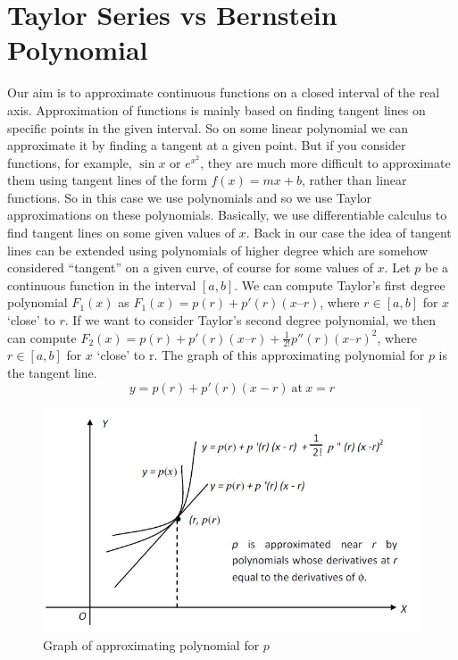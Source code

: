 \documentclass{article}
\begin{document}
\section{Taylor Series vs Bernstein Polynomial}\label{sec:tsvsbp}
Our aim is to approximate continuous functions on a closed interval of the real axis. Approximation of functions is mainly based on finding tangent lines on specific points in the given interval. So on some linear polynomial we can approximate it by finding a tangent at a given point. But if you consider functions, for example, $\sin x$ or  $e^{x^2} $, they are much more difficult to approximate them using tangent lines of the form $f(x) =mx+b$, rather than linear functions. So in this case we use polynomials and so we use Taylor approximations on these polynomials. Basically, we use differentiable calculus to find tangent lines on some given values of $x$. Back in our case the idea of tangent lines can be extended using polynomials of higher degree which are somehow considered ``tangent'' on a given curve, of course for some values of $x$.
Let $p$ be a continuous function in the interval $[a,b]$. We can compute Taylor’s first degree polynomial $F_1(x)$ as $F_1(x)=p(r) + p'(r) (x – r)$, where $r\in[a,b]$ for $x$ `close' to $r$. If we want to consider Taylor’s second degree polynomial, we then can compute $F_2(x)= p(r) + p '(r) (x – r)+ \frac{1}{2!}p''(r) (x – r)^2$, where $r \in [a,b]$ for $x$ `close' to r.
The graph of this approximating polynomial for $p$ is the tangent line.
\begin{equation*}
    y=p(r)+p'(r)(x-r) \ \text{at}\ x=r
\end{equation*}
\begin{figure}[h!]
\centering
\includegraphics[width=1\textwidth]{Project-weierstrass.JPG}
    \caption{Graph of approximating polynomial for $p$}
    \label{fig:1}
\end{figure}
\end{document}
